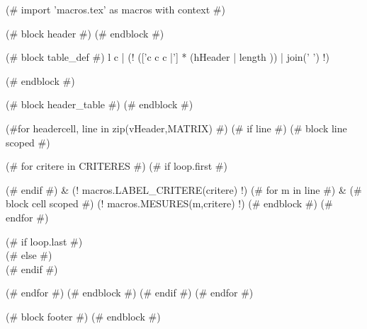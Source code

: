 (# import 'macros.tex' as macros with context #)

(# block header #)
(# endblock #)


\setlength\tabcolsep{0.07cm}
\begin{longtable}
    (# block table_def #){ l c | (! (['c c c |'] *  (hHeader | length )) | join(' ') !) }
    (# endblock #)



    (# block header_table #)
    (# endblock #)


    \endfirsthead
    \endhead
    \endfoot
    \endlastfoot

    (#for headercell, line in zip(vHeader,MATRIX) #)
    (# if line #)
    \hline
    (# block line scoped #)

    (# for critere in CRITERES #)
    (# if loop.first #)


    (# endif #)
    & (! macros.LABEL_CRITERE(critere) !)
    (# for m in line #)
    &
    (# block cell scoped #)
    (! macros.MESURES(m,critere) !)
    (# endblock #)
    (# endfor #)

    (# if loop.last #) \\ (# else #) \\* (# endif #)

    (# endfor #)
    (# endblock #)
    (# endif #)
    (# endfor #)
    \hline
    \caption{\textbf{(! title !)}. (! description !)}
    \label{tab:(! label !)}
\end{longtable}


(# block footer #)
(# endblock #)
